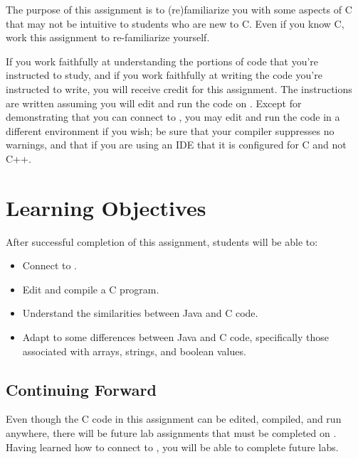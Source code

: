 


\renewcommand{\labnumber}{1}
\renewcommand{\labname}{C Programming Familiarization Lab}
\renewcommand{\shortlabname}{pokerlab}
\renewcommand{\collaborationrules}{Except as noted in Section~\ref{studyTheCode}, \individualeffort}
\renewcommand{\duedate}{Week of January 24, before the start of your lab section}
\startdocument
% 

The purpose of this assignment is to (re)familiarize you with some aspects of C
that may not be intuitive to students who are new to C. Even if you know C,
work this assignment to re-familiarize yourself.

If you work faithfully at understanding the portions of code that you're
instructed to study, and if you work faithfully at writing the code you're
instructed to write, you will receive credit for this assignment. The
instructions are written assuming you will edit and run the code on
\runtimeenvironment. Except for demonstrating that you can connect to
\runtimeenvironment, you may edit and run the code in a different environment
if you wish; be sure that your compiler suppresses no warnings, and that if you
are using an IDE that it is configured for C and not C++.

\section*{Learning Objectives}

After successful completion of this assignment, students will be able to:
\begin{itemize}
\item Connect to \runtimeenvironment.
\item Edit and compile a C program.
\item Understand the similarities between Java and C code.
\item Adapt to some differences between Java and C code, specifically those
    associated with arrays, strings, and boolean values.
\end{itemize}

\subsection*{Continuing Forward}

Even though the C code in this assignment can be edited, compiled, and run
anywhere, there will be future lab assignments that must be completed on
\runtimeenvironment. Having learned how to connect to \runtimeenvironment, you
will be able to complete future labs.

